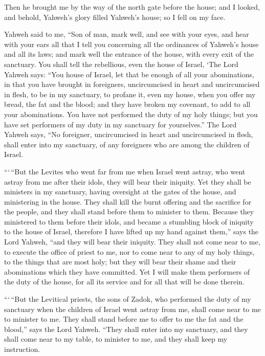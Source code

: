  Then he brought me by the way of the north gate before the
house; and I looked, and behold, Yahweh's glory filled Yahweh's house;
so I fell on my face.

 Yahweh said to me, ``Son of man, mark well, and see with
your eyes, and hear with your ears all that I tell you concerning all
the ordinances of Yahweh's house and all its laws; and mark well the
entrance of the house, with every exit of the sanctuary. 
You shall tell the rebellious, even the house of Israel, `The Lord
Yahweh says: ``You house of Israel, let that be enough of all your
abominations,  in that you have brought in foreigners,
uncircumcised in heart and uncircumcised in flesh, to be in my
sanctuary, to profane it, even my house, when you offer my bread, the
fat and the blood; and they have broken my covenant, to add to all your
abominations.  You have not performed the duty of my holy
things; but you have set performers of my duty in my sanctuary for
yourselves.''  The Lord Yahweh says, ``No foreigner,
uncircumcised in heart and uncircumcised in flesh, shall enter into my
sanctuary, of any foreigners who are among the children of Israel.

 ```\,``But the Levites who went far from me when Israel
went astray, who went astray from me after their idols, they will bear
their iniquity.  Yet they shall be ministers in my
sanctuary, having oversight at the gates of the house, and ministering
in the house. They shall kill the burnt offering and the sacrifice for
the people, and they shall stand before them to minister to them.
 Because they ministered to them before their idols, and
became a stumbling block of iniquity to the house of Israel, therefore I
have lifted up my hand against them,'' says the Lord Yahweh, ``and they
will bear their iniquity.  They shall not come near to me,
to execute the office of priest to me, nor to come near to any of my
holy things, to the things that are most holy; but they will bear their
shame and their abominations which they have committed. 
Yet I will make them performers of the duty of the house, for all its
service and for all that will be done therein.

 ```\,``But the Levitical priests, the sons of Zadok, who
performed the duty of my sanctuary when the children of Israel went
astray from me, shall come near to me to minister to me. They shall
stand before me to offer to me the fat and the blood,'' says the Lord
Yahweh.  ``They shall enter into my sanctuary, and they
shall come near to my table, to minister to me, and they shall keep my
instruction.

